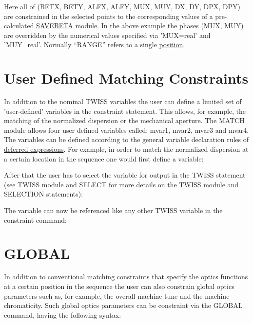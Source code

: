 Here all of (BETX, BETY, ALFX, ALFY, MUX, MUY, DX, DY, DPX, DPY)
are constrained in the selected points to the corresponding values
of a pre-calculated \href{../control/general.html#savebeta}{SAVEBETA} module.
In the above example
the phases (MUX, MUY) are overridden by the numerical values specified via
'MUX=real' and 'MUY=real'.
Normally ``RANGE'' refers to a single
\href{../Introduction/ranges.html#position}{position}.

\section{User Defined Matching Constraints}
\label{sec:userconstraint}

In addition to the nominal TWISS variables the user can define a limited
set of 'user-defined' variables in the constraint statement. This
allows, for example, the matching of the normalized dispersion or the
mechanical aperture. The MATCH module allows four user defined variables
called: mvar1, mvar2, mvar3 and mvar4. 
The variables can be defined according to the general variable
declaration rules of  
\href{../Introduction/expression.html#defer}{deferred expressions}.
For example, in order to match the normalized dispersion at a certain
location in the sequence one would first define a variable:


After that the user has to select the variable for output in the TWISS
statement (see \href{../twiss/twiss.html}{TWISS module} and
\href{../Introduction/select.html}{SELECT} for more
details on the TWISS module and SELECTION statements):

The variable can now be referenced like any other TWISS variable
in the constraint command:

\section{GLOBAL}
\label{sec:global}

In addition to conventional matching constraints that specify the optics 
functions at a certain position in the sequence the user can also constrain 
global optics parameters such as, for example, the overall machine tune
and the machine chromaticity. Such global optics parameters can be
constraint via the  GLOBAL command, having the following syntax:

